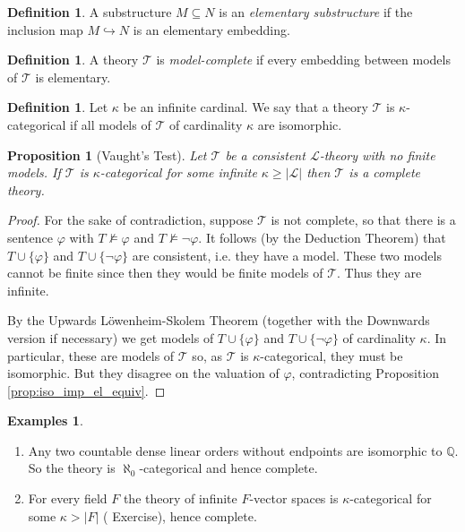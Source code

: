 \documentclass{report}
\theoremstyle{definition}
\theoremstyle{plain}
\newtheorem{prop}[thm]{Proposition}
\theoremstyle{definition}
\newtheorem{defn}[thm]{Definition}
\newtheorem{egs}[thm]{Examples}
\begin{document}
		\begin{defn}
			A substructure $M\subseteq N$ is an \emph{elementary substructure} if the inclusion map $M \hookrightarrow N$ is an elementary embedding.
		\end{defn}
		\begin{defn}
			A theory $\mathcal{T}$ is \emph{model-complete} if every embedding between models of $\mathcal{T}$ is elementary.
		\end{defn}
		\begin{defn}
			Let $\kappa$ be an infinite cardinal. We say that a theory $\mathcal{T}$ is $\kappa$-categorical if all models of $\mathcal{T}$ of cardinality $\kappa$ are isomorphic.
		\end{defn}
		\begin{prop}[Vaught's Test]
			Let $\mathcal{T}$ be a consistent $\mathcal{L}$-theory with no finite models. If $\mathcal{T}$ is $\kappa$-categorical for some infinite $\kappa\geq |\mathcal{L}|$ then $\mathcal{T}$ is a complete theory. 
		\end{prop}
		\begin{proof}
			For the sake of contradiction, suppose $\mathcal{T}$ is not complete, so that there is a sentence $\varphi$ with $T \nvDash \varphi$ and $T\nvDash \neg\varphi$. It follows (by the Deduction Theorem) that $T\cup\{\varphi\}$ and $T\cup\{\neg\varphi\}$ are consistent, i.e. they have a model.
			These two models cannot be finite since then they would be finite models of $\mathcal{T}$. Thus they are infinite.
			
			By the Upwards L{\"o}wenheim-Skolem Theorem (together with the Downwards version if necessary) we get models of $T\cup\{\varphi\}$ and $T\cup\{\neg\varphi\}$ of cardinality $\kappa$. In particular, these are models of $\mathcal{T}$ so, as $\mathcal{T}$ is $\kappa$-categorical, they must be isomorphic. But they disagree on the valuation of $\varphi$, contradicting Proposition \ref{prop:iso_imp_el_equiv}.
 		\end{proof}
 		\begin{egs}\label{egs:vaught_test}\leavevmode
 			\begin{enumerate}
 				\item Any two countable dense linear orders without endpoints are isomorphic to $\mathbb{Q}$. So the theory is $\aleph_0$-categorical and hence complete.
 				\item For every field $F$ the theory of infinite $F$-vector spaces is $\kappa$-categorical for some $\kappa > |F|$ ({\color{red} Exercise}), hence complete.
 			\end{enumerate}
 		\end{egs}
\end{document}
